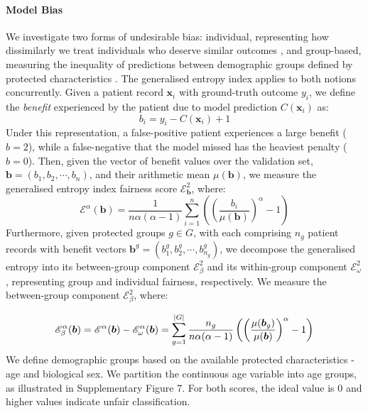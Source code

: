 \documentclass[fleqn,10pt]{wlscirep}
\DeclarePairedDelimiter\abs{\lvert}{\rvert}%
\begin{document}
\paragraph{Model Bias} We investigate two forms of undesirable bias: individual, representing how dissimilarly we treat individuals who deserve similar outcomes \cite{Dwork12}, and group-based, measuring the inequality of predictions between demographic groups defined by protected characteristics \cite{Binns20}. The generalised entropy index\cite{Speicher18} applies to both notions concurrently. Given a patient record $\bm{x}_i$ with ground-truth outcome $y_i$, we define the \emph{benefit} experienced by the patient due to model prediction $C(\bm{x}_i)$ as:
\begin{equation*}
    b_i = y_i - C(\bm{x}_i) +1
\end{equation*}
Under this representation, a false-positive patient experiences a large benefit ($b=2$), while a false-negative that the model missed has the heaviest penalty ($b=0$). Then, given the vector of benefit values over the validation set, $\bm{b} = (b_1, b_2, \cdots, b_n)$, and their arithmetic mean $\mu(\bm{b})$, we measure the generalised entropy index fairness score $\mathcal{E}^2_{\bm{b}}$, where:
\begin{equation*}
    \mathcal{E}^{\alpha}(\bm{b}) = \frac{1}{n \alpha (\alpha-1)} \sum_{i=1}^n \left(\left( \frac{b_i}{\mu(\bm{b})} \right)^{\alpha}-1 \right)
\end{equation*}
Furthermore, given protected groups $g \in G$, with each comprising $n_g$ patient records with benefit vectors $\bm{b}^g = (b^g_1, b^g_2, \cdots, b^g_{n_g})$, we decompose the generalised entropy into its between-group component $\mathcal{E}^2_{\beta}$ and its within-group component $\mathcal{E}^2_{\omega}$, representing group and individual fairness, respectively. We measure the between-group component $\mathcal{E}^2_{\beta}$, where:

\begin{equation*}
    \mathcal{E}^{\alpha}_{\beta}(\bm{b}) = \mathcal{E}^{\alpha}(\bm{b}) - \mathcal{E}^{\alpha}_{\omega}(\bm{b}) = \sum^{\abs{G}}_{g=1} \frac{n_g}{n \alpha (\alpha-1)} \left(\left( \frac{\mu(\bm{b}_g)}{\mu(\bm{b})} \right)^{\alpha}-1 \right)
\end{equation*}
We define demographic groups based on the available protected characteristics - age and biological sex.  We partition the continuous age variable into age groups, as illustrated in Supplementary Figure 7. For both scores, the ideal value is $0$ and higher values indicate unfair classification.
\end{document}
